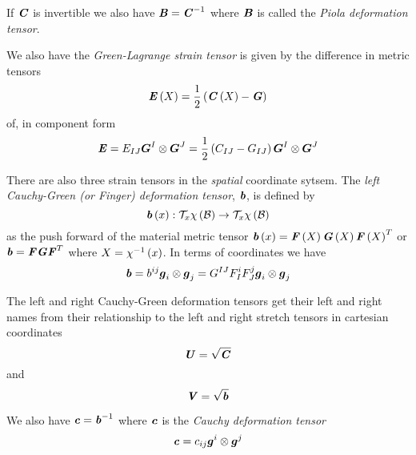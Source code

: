 If $\tensor{C}$ is invertible we also have $\tensor{B}=\inverse{\tensor{C}}$
where $\tensor{B}$ is called the \emph{Piola deformation
  tensor}.

We also have the \emph{Green-Lagrange strain tensor} is given by the difference
in metric tensors
\begin{equation}
  \fnof{\tensor{E}}{X}=\frac{1}{2}\pbrac{\fnof{\tensor{C}}{X}-\tensor{G}}
\end{equation}
of, in component form
\begin{equation}
  \tensor{E}=E_{IJ}\tensorprod{\vectr{G}^{I}}{\vectr{G}^{J}}=\frac{1}{2}\pbrac{C_{IJ}-G_{IJ}}\tensorprod{\vectr{G}^{I}}{\vectr{G}^{J}}
\end{equation}

There are also three strain tensors in the \emph{spatial} coordinate
sytsem. The \emph{left Cauchy-Green (or Finger) deformation tensor},
$\tensor{b}$, is defined by
\begin{equation}
  \mapping{\fnof{\tensor{b}}{x}}{\tangentspace{\fnof{\chi}{\embedmanifold{B}}}{x}}{\tangentspace{\fnof{\chi}{\embedmanifold{B}}}{x}}
\end{equation}
as the push forward of the material metric tensor \ie
$\fnof{\tensor{b}}{x}=\fnof{\tensor{F}}{X}\fnof{\tensor{G}}{X}\transpose{\fnof{\tensor{F}}{X}}$
or $\tensor{b}=\tensor{F}\tensor{G}\transpose{\tensor{F}}$ where
$X=\fnof{\inverse{\chi}}{x}$. In terms of coordinates we have
\begin{equation}
  \tensor{b}=b^{ij}\tensorprod{\vectr{g}_{i}}{\vectr{g}_{j}}=G^{IJ}F^{i}_{I}F^{j}_{J}\tensorprod{\vectr{g}_{i}}{\vectr{g}_{j}}
\end{equation}

The left and right Cauchy-Green deformation tensors get their left and right
names from their relationship to the left and right stretch tensors \ie in
cartesian coordinates
\begin{equation}
  \tensor{U}=\sqrt{\tensor{C}}
\end{equation}
and
\begin{equation}
  \tensor{V}=\sqrt{\tensor{b}}
\end{equation}

We also have $\tensor{c}=\inverse{\tensor{b}}$ where $\tensor{c}$ is the
\emph{Cauchy deformation tensor} \ie {}
\begin{equation}
	  \tensor{c}=c_{ij}\tensorprod{\vectr{g}^{i}}{\vectr{g}^{j}}
\end{equation}

